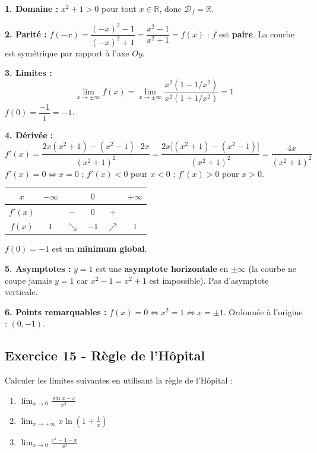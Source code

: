 \documentclass[12pt,a4paper]{article}
\begin{document}
\begin{boitecorrige}
\textbf{1. Domaine :} $x^2+1 > 0$ pour tout $x\in\mathbb{R}$, donc $\mathcal{D}_f = \mathbb{R}$.

\textbf{2. Parité :} $f(-x) = \dfrac{(-x)^2-1}{(-x)^2+1} = \dfrac{x^2-1}{x^2+1} = f(x)$ : $f$ est \textbf{paire}. La courbe est symétrique par rapport à l'axe $Oy$.

\textbf{3. Limites :}
\[
\lim_{x\to\pm\infty} f(x) = \lim_{x\to\pm\infty}\frac{x^2(1-1/x^2)}{x^2(1+1/x^2)} = 1
\]
$f(0) = \dfrac{-1}{1} = -1$.

\textbf{4. Dérivée :}
\[
f'(x) = \frac{2x(x^2+1) - (x^2-1)\cdot 2x}{(x^2+1)^2} = \frac{2x\bigl[(x^2+1)-(x^2-1)\bigr]}{(x^2+1)^2} = \frac{4x}{(x^2+1)^2}
\]
$f'(x) = 0 \Leftrightarrow x=0$ ; $f'(x)<0$ pour $x<0$ ; $f'(x)>0$ pour $x>0$.

\begin{center}
\begin{tabular}{c|ccccc}
$x$ & $-\infty$ & & $0$ & & $+\infty$ \\
\hline
$f'(x)$ & & $-$ & $0$ & $+$ & \\
\hline
$f(x)$ & $1$ & $\searrow$ & $-1$ & $\nearrow$ & $1$ \\
\end{tabular}
\end{center}

$f(0) = -1$ est un \textbf{minimum global}.

\textbf{5. Asymptotes :} $y=1$ est une \textbf{asymptote horizontale} en $\pm\infty$ (la courbe ne coupe jamais $y=1$ car $x^2-1=x^2+1$ est impossible). Pas d'asymptote verticale.

\textbf{6. Points remarquables :} $f(x)=0 \Leftrightarrow x^2=1 \Leftrightarrow x=\pm1$. Ordonnée à l'origine : $(0,-1)$.
\end{boitecorrige}

\subsection*{Exercice 15 - Règle de l'Hôpital \niveau{\moyen}}
\begin{boiteexercice}
Calculer les limites suivantes en utilisant la règle de l'Hôpital :

\begin{enumerate}
  \item $\displaystyle\lim_{x\to0}\frac{\sin x - x}{x^3}$
  \item $\displaystyle\lim_{x\to+\infty} x\ln\!\left(1+\frac{1}{x}\right)$
  \item $\displaystyle\lim_{x\to0}\frac{e^x - 1 - x}{x^2}$
\end{enumerate}
\end{boiteexercice}
\end{document}
